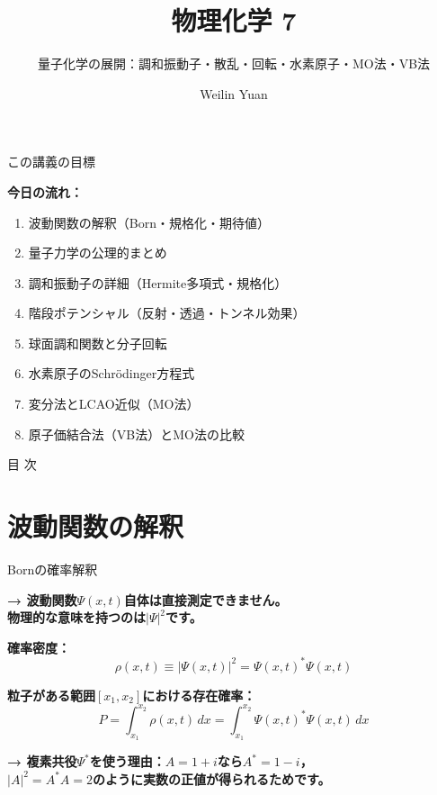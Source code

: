 \documentclass[aspectratio=169, 11pt]{beamer}
\title{物理化学 7}
\subtitle{量子化学の展開：調和振動子・散乱・回転・水素原子・MO法・VB法}
\author{Weilin Yuan}
\date{}
\institute{}
\newcommand{\teacher}[1]{{\color{darkblue}\textbf{→ #1}}}
\begin{document}
\maketitle

\begin{frame}{この講義の目標}

\textbf{今日の流れ：}
\begin{enumerate}
  \item 波動関数の解釈（Born・規格化・期待値）
  \item 量子力学の公理的まとめ
  \item 調和振動子の詳細（Hermite多項式・規格化）
  \item 階段ポテンシャル（反射・透過・トンネル効果）
  \item 球面調和関数と分子回転
  \item 水素原子のSchrödinger方程式
  \item 変分法とLCAO近似（MO法）
  \item 原子価結合法（VB法）とMO法の比較
\end{enumerate}
\end{frame}

\begin{frame}{目 次}
\tableofcontents
\end{frame}

\section{波動関数の解釈}

\begin{frame}{Bornの確率解釈}

\teacher{波動関数$\Psi(x,t)$自体は直接測定できません。\\
物理的な意味を持つのは$|\Psi|^2$です。}

\vspace{0.3em}
\textbf{確率密度：}
\[
  \rho(x,t) \equiv |\Psi(x,t)|^2 = \Psi(x,t)^*\Psi(x,t)
\]

\textbf{粒子がある範囲$[x_1, x_2]$における存在確率：}
\[
  P = \int_{x_1}^{x_2} \rho(x,t)\,dx = \int_{x_1}^{x_2} \Psi(x,t)^*\Psi(x,t)\,dx
\]

\teacher{複素共役$\Psi^*$を使う理由：$A = 1+i$なら$A^* = 1-i$，\\
$|A|^2 = A^*A = 2$のように実数の正値が得られるためです。}
\end{frame}
\end{document}
